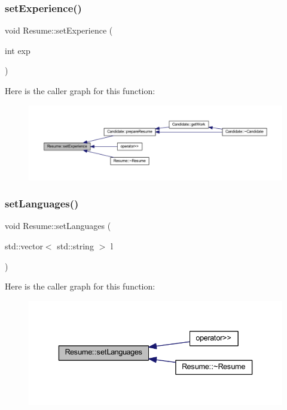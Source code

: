 \subsubsection{\texorpdfstring{set\+Experience()}{setExperience()}}
{\footnotesize\ttfamily void Resume\+::set\+Experience (\begin{DoxyParamCaption}\item[{int}]{exp }\end{DoxyParamCaption})}

Here is the caller graph for this function\+:
\nopagebreak
\begin{figure}[H]
\begin{center}
\leavevmode
\includegraphics[width=350pt]{class_resume_a3742ddd777e93ad124560cec7da409fa_icgraph}
\end{center}
\end{figure}
\hypertarget{class_resume_ae51fc034e53ba1118f3d49b3bd0b1e0f}{}\label{class_resume_ae51fc034e53ba1118f3d49b3bd0b1e0f} 
\subsubsection{\texorpdfstring{set\+Languages()}{setLanguages()}}
{\footnotesize\ttfamily void Resume\+::set\+Languages (\begin{DoxyParamCaption}\item[{std\+::vector$<$ std\+::string $>$}]{l }\end{DoxyParamCaption})}

Here is the caller graph for this function\+:
\nopagebreak
\begin{figure}[H]
\begin{center}
\leavevmode
\includegraphics[width=336pt]{class_resume_ae51fc034e53ba1118f3d49b3bd0b1e0f_icgraph}
\end{center}
\end{figure}
\hypertarget{class_resume_a47a244bcf3498360be01b98c8773c847}{}\label{class_resume_a47a244bcf3498360be01b98c8773c847} 
